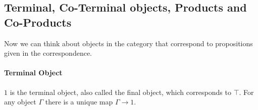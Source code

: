 \subsection{Terminal, Co-Terminal objects, Products and Co-Products}
Now we can think about objects in the category that correspond to propositions given in the correspondence.

\paragraph{Terminal Object}
$1$ is the terminal object, also called the final object, which corresponds to $\top$. For any object $\Gamma$ there is a unique map $\Gamma\to 1$. 
\begin{mdframed}
\end{mdframed}



